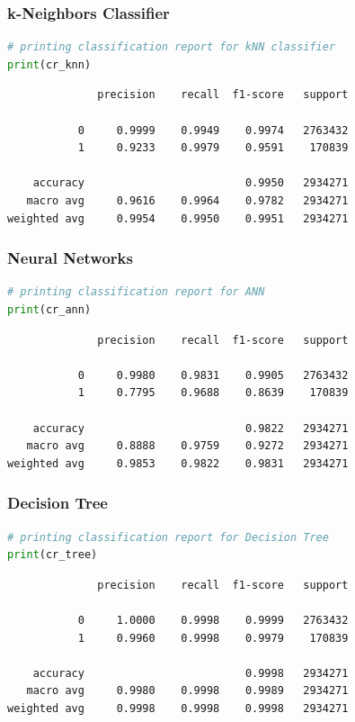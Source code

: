 \documentclass{article}
\begin{document}
\subsubsection{k-Neighbors Classifier}
\begin{lstlisting}[language=Python]
# printing classification report for kNN classifier
print(cr_knn)
\end{lstlisting}
\begin{verbatim}  
              precision    recall  f1-score   support

           0     0.9999    0.9949    0.9974   2763432
           1     0.9233    0.9979    0.9591    170839

    accuracy                         0.9950   2934271
   macro avg     0.9616    0.9964    0.9782   2934271
weighted avg     0.9954    0.9950    0.9951   2934271
\end{verbatim}

\subsubsection{Neural Networks}
\begin{lstlisting}[language=Python]
# printing classification report for ANN
print(cr_ann)
\end{lstlisting}
\begin{verbatim}    
              precision    recall  f1-score   support

           0     0.9980    0.9831    0.9905   2763432
           1     0.7795    0.9688    0.8639    170839

    accuracy                         0.9822   2934271
   macro avg     0.8888    0.9759    0.9272   2934271
weighted avg     0.9853    0.9822    0.9831   2934271
\end{verbatim}

\subsubsection{Decision Tree}
\begin{lstlisting}[language=Python]
# printing classification report for Decision Tree
print(cr_tree)
\end{lstlisting}
\begin{verbatim}
              precision    recall  f1-score   support

           0     1.0000    0.9998    0.9999   2763432
           1     0.9960    0.9998    0.9979    170839

    accuracy                         0.9998   2934271
   macro avg     0.9980    0.9998    0.9989   2934271
weighted avg     0.9998    0.9998    0.9998   2934271
\end{verbatim}
\end{document}

